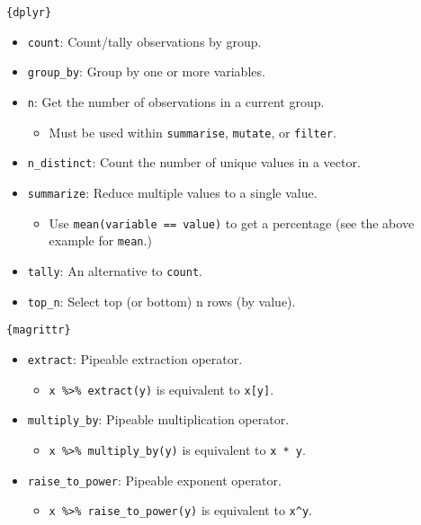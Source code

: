 \documentclass[]{book}
\providecommand{\tightlist}{%
  \setlength{\itemsep}{0pt}\setlength{\parskip}{0pt}}
\begin{document}
\texttt{\{dplyr\}}

\begin{itemize}
\tightlist
\item
  \texttt{count}: Count/tally observations by group.
\item
  \texttt{group\_by}: Group by one or more variables.
\item
  \texttt{n}: Get the number of observations in a current group.

  \begin{itemize}
  \tightlist
  \item
    Must be used within \texttt{summarise}, \texttt{mutate}, or \texttt{filter}.
  \end{itemize}
\item
  \texttt{n\_distinct}: Count the number of unique values in a vector.
\item
  \texttt{summarize}: Reduce multiple values to a single value.

  \begin{itemize}
  \tightlist
  \item
    Use \texttt{mean(variable\ ==\ value)} to get a percentage (see the above example for \texttt{mean}.)
  \end{itemize}
\item
  \texttt{tally}: An alternative to \texttt{count}.
\item
  \texttt{top\_n}: Select top (or bottom) n rows (by value).
\end{itemize}

\texttt{\{magrittr\}}

\begin{itemize}
\tightlist
\item
  \texttt{extract}: Pipeable extraction operator.

  \begin{itemize}
  \tightlist
  \item
    \texttt{x\ \%\textgreater{}\%\ extract(y)} is equivalent to \texttt{x{[}y{]}}.
  \end{itemize}
\item
  \texttt{multiply\_by}: Pipeable multiplication operator.

  \begin{itemize}
  \tightlist
  \item
    \texttt{x\ \%\textgreater{}\%\ multiply\_by(y)} is equivalent to \texttt{x\ *\ y}.
  \end{itemize}
\item
  \texttt{raise\_to\_power}: Pipeable exponent operator.

  \begin{itemize}
  \tightlist
  \item
    \texttt{x\ \%\textgreater{}\%\ raise\_to\_power(y)} is equivalent to \texttt{x\^{}y}.
  \end{itemize}
\end{itemize}
\end{document}
